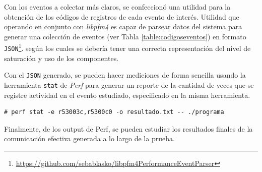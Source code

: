Con los eventos a colectar más claros, se confeccionó una utilidad para la obtención de los códigos de registros de cada evento de interés. Utilidad que operando en conjunto con \emph{libpfm4} es capaz de parsear datos del sistema para generar una colección de eventos (ver Tabla \ref{table:codigoseventos}) en formato \verb=JSON=\footnote{\url{https://github.com/sebablasko/libpfm4PerformanceEventParser}}. según los cuales se debería tener una correcta representación del nivel de saturación y uso de los componentes.

Con el \verb=JSON= generado, se pueden hacer mediciones de forma sencilla usando la herramienta \verb=stat= de \emph{Perf} para generar un reporte de la cantidad de veces que se registre actividad en el evento estudiado, especificado en la misma herramienta.

\begin{lstlisting}[style=BashInputStyle, breaklines=true, captionpos=b, caption={Ejemplo de uso de Perf para colectar datos de una colección de eventos sobre un script llamado programa. En éste caso se configura para colectar datos de 2 eventos y dejar el reporte de salida en un archivo resultado.txt}]
	# perf stat -e r53003c,r5300c0 -o resultado.txt -- ./programa
\end{lstlisting}

Finalmente, de los output de Perf, se pueden estudiar los resultados finales de la comunicación efectiva generada a lo largo de la prueba.

